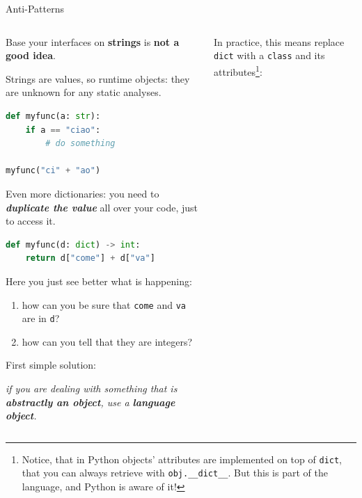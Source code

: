 \documentclass[9pt]{beamer}
\begin{document}
\begin{frame}[fragile]{Anti-Patterns}
    \vspace*{20pt}
    \begin{columns}
        \begin{column}{0.5\textwidth}
            Base your interfaces on \textbf{strings} is \textbf{not a good
            idea}.

            Strings are values, so runtime objects: they are unknown for any
            static analyses.

            \begin{lstlisting}[language=Python,style=mystyle]
def myfunc(a: str):
    if a == "ciao":
        # do something

myfunc("ci" + "ao")\end{lstlisting}
            \vspace*{10pt}

            Even more dictionaries: you need to \textit{\textbf{duplicate the
            value}} all over your code, just to access it.

            \begin{lstlisting}[language=Python,style=mystyle]
def myfunc(d: dict) -> int:
    return d["come"] + d["va"]\end{lstlisting}

            Here you just see better what is happening:

            \begin{enumerate}
                \item how can you be sure that \texttt{come} and \texttt{va}
                    are in \texttt{d}?
                \item how can you tell that they are integers?
            \end{enumerate}
            \vspace*{10pt}

            First simple solution: 
            \begin{center}
                \itshape
                if you are dealing with something that is \textbf{abstractly an
                object}, use a \textbf{language object}.
            \end{center}
        \end{column}
        \begin{column}{0.5\textwidth}
            In practice, this means replace \texttt{dict} with a \texttt{class}
            and its attributes\footnote{
                Notice, that in Python objects' attributes are implemented on
                top of \texttt{dict}, that you can always retrieve with
                \texttt{obj.\_\_dict\_\_}. But this is part of the language,
                and Python is aware of it!
            }:



\end{column}
\end{columns}
\end{frame}
\end{document}
